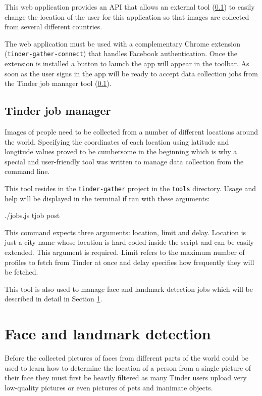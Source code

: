 This web application provides an API that allows an external tool 
(\ref{spec:data:jobs}) to easily change the location of the user for this 
application so that images are collected from several different 
countries.

The web application must be used with a complementary Chrome extension 
(\texttt{tinder-gather-connect}) that handles Facebook authentication.
Once the extension is installed a button to launch the app will appear in the 
toolbar. As soon as the user signs in the app will be ready to accept data 
collection jobs from the Tinder job manager tool (\ref{spec:data:jobs}).

\subsection{Tinder job manager}
\label{spec:data:jobs}
Images of people need to be collected from a number of different locations 
around the world. Specifying the coordinates of each location using latitude 
and longitude values proved to be cumbersome in the beginning which is why a 
special and user-friendly tool was written to manage data collection from the 
command line.

This tool resides in the \texttt{tinder-gather} project in the \texttt{tools} 
directory. Usage and help will be displayed in the terminal if ran with these 
arguments:
\begin{logs}
./jobs.js tjob post
\end{logs}

This command expects three arguments: location, limit and delay. Location is 
just a city name whose location is hard-coded inside the script and can be 
easily extended. This argument is required. Limit refers to the maximum number 
of profiles to fetch from Tinder at once and delay specifies how frequently 
they will be fetched.

This tool is also used to manage face and landmark detection jobs which will 
be described in detail in Section \ref{spec:fd}. 

\section{Face and landmark detection}
\label{spec:fd}
Before the collected pictures of faces from different parts of the world 
could be used to learn how to determine the location of a person from a single 
picture of their face they must first be heavily filtered as many Tinder users 
upload very low-quality pictures or even pictures of pets and inanimate 
objects.

